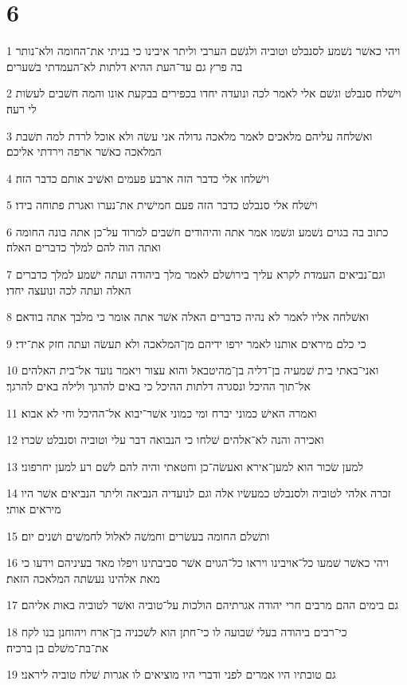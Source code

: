 \chapter{6}

\par 1 ויהי כאשׁר נשׁמע לסנבלט וטוביה ולגשׁם הערבי וליתר איבינו כי בניתי את־החומה ולא־נותר בה פרץ גם עד־העת ההיא דלתות לא־העמדתי בשׁערים׃
\par 2 וישׁלח סנבלט וגשׁם אלי לאמר לכה ונועדה יחדו בכפירים בבקעת אונו והמה חשׁבים לעשׂות לי רעה׃
\par 3 ואשׁלחה עליהם מלאכים לאמר מלאכה גדולה אני עשׂה ולא אוכל לרדת למה תשׁבת המלאכה כאשׁר ארפה וירדתי אליכם׃
\par 4 וישׁלחו אלי כדבר הזה ארבע פעמים ואשׁיב אותם כדבר הזה׃
\par 5 וישׁלח אלי סנבלט כדבר הזה פעם חמישׁית את־נערו ואגרת פתוחה בידו׃
\par 6 כתוב בה בגוים נשׁמע וגשׁמו אמר אתה והיהודים חשׁבים למרוד על־כן אתה בונה החומה ואתה הוה להם למלך כדברים האלה׃
\par 7 וגם־נביאים העמדת לקרא עליך בירושׁלם לאמר מלך ביהודה ועתה ישׁמע למלך כדברים האלה ועתה לכה ונועצה יחדו׃
\par 8 ואשׁלחה אליו לאמר לא נהיה כדברים האלה אשׁר אתה אומר כי מלבך אתה בודאם׃
\par 9 כי כלם מיראים אותנו לאמר ירפו ידיהם מן־המלאכה ולא תעשׂה ועתה חזק את־ידי׃
\par 10 ואני־באתי בית שׁמעיה בן־דליה בן־מהיטבאל והוא עצור ויאמר נועד אל־בית האלהים אל־תוך ההיכל ונסגרה דלתות ההיכל כי באים להרגך ולילה באים להרגך׃
\par 11 ואמרה האישׁ כמוני יברח ומי כמוני אשׁר־יבוא אל־ההיכל וחי לא אבוא׃
\par 12 ואכירה והנה לא־אלהים שׁלחו כי הנבואה דבר עלי וטוביה וסנבלט שׂכרו׃
\par 13 למען שׂכור הוא למען־אירא ואעשׂה־כן וחטאתי והיה להם לשׁם רע למען יחרפוני׃
\par 14 זכרה אלהי לטוביה ולסנבלט כמעשׂיו אלה וגם לנועדיה הנביאה וליתר הנביאים אשׁר היו מיראים אותי׃
\par 15 ותשׁלם החומה בעשׂרים וחמשׁה לאלול לחמשׁים ושׁנים יום׃
\par 16 ויהי כאשׁר שׁמעו כל־אויבינו ויראו כל־הגוים אשׁר סביבתינו ויפלו מאד בעיניהם וידעו כי מאת אלהינו נעשׂתה המלאכה הזאת׃
\par 17 גם בימים ההם מרבים חרי יהודה אגרתיהם הולכות על־טוביה ואשׁר לטוביה באות אליהם׃
\par 18 כי־רבים ביהודה בעלי שׁבועה לו כי־חתן הוא לשׁכניה בן־ארח ויהוחנן בנו לקח את־בת־משׁלם בן ברכיה׃
\par 19 גם טובתיו היו אמרים לפני ודברי היו מוציאים לו אגרות שׁלח טוביה ליראני׃


